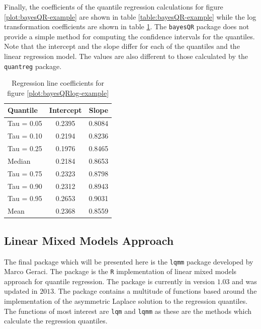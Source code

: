 \documentclass[12pt,a4paper]{report}
\begin{document}
Finally, the coefficients of the quantile regression calculations for figure \ref{plot:bayesQR-example} are shown in table \ref{table:bayesQR-example} while the log transformation coefficients are shown in table \ref{table:bayesQRlog-example}. The {\small\verb"bayesQR"} package does not provide a simple method for computing the confidence intervals for the quantiles. Note that the intercept and the slope differ for each of the quantiles and the linear regression model. The values are also different to those calculated by the {\small\verb"quantreg"} package.
\vspace{2mm}

\begin{table}[ht]
\begin{center}
\begin{tabular}{|l||c|c|} \hline
\multicolumn{1}{|l||}{Quantile}&\multicolumn{1}{c|}{Intercept}&\multicolumn{1}{c|}{Slope}\tabularnewline
\hline
Tau = 0.05 & 0.2395 & 0.8084 \tabularnewline
Tau = 0.10 & 0.2194 & 0.8236 \tabularnewline
Tau = 0.25 & 0.1976 & 0.8465 \tabularnewline
Median & 0.2184 & 0.8653 \tabularnewline
Tau = 0.75 & 0.2323 & 0.8798 \tabularnewline
Tau = 0.90 & 0.2312 & 0.8943 \tabularnewline
Tau = 0.95 & 0.2653 & 0.9031 \tabularnewline
Mean & 0.2368 & 0.8559 \tabularnewline
\hline
\end{tabular}
\end{center}
\caption{Regression line coefficients for figure \ref{plot:bayesQRlog-example}}
\label{table:bayesQRlog-example}
\end{table}

\subsection{Linear Mixed Models Approach}
The final package which will be presented here is the {\small\verb"lqmm"} package developed by Marco Geraci. The package is the {\small\verb"R"} implementation of linear mixed models approach for quantile regression. The package is currently in version $1.03$ and was updated in $2013$. The package contains a multitude of functions based around the implementation of the asymmetric Laplace solution to the regression quantiles. The functions of most interest are {\small\verb"lqm"} and {\small\verb"lqmm"} as these are the methods which calculate the regression quantiles.
\vspace{2mm}
\end{document}
